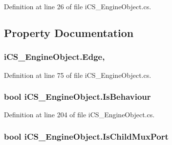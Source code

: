 Definition at line 26 of file i\+C\+S\+\_\+\+Engine\+Object.\+cs.



\subsection{Property Documentation}
\hypertarget{classi_c_s___engine_object_abd5c79ea55088275609565e1e79cc96a}{
\subsubsection[{Edge}]{ i\+C\+S\+\_\+\+Engine\+Object.\+Edge\hspace{0.3cm}{\ttfamily [get]}, {\ttfamily [set]}}}\label{classi_c_s___engine_object_abd5c79ea55088275609565e1e79cc96a}


Definition at line 75 of file i\+C\+S\+\_\+\+Engine\+Object.\+cs.

\hypertarget{classi_c_s___engine_object_aa81044c4d72b0846f8ba9918f47300ca}{
\subsubsection[{Is\+Behaviour}]{\setlength{\rightskip}{0pt plus 5cm}bool i\+C\+S\+\_\+\+Engine\+Object.\+Is\+Behaviour\hspace{0.3cm}{\ttfamily [get]}}}\label{classi_c_s___engine_object_aa81044c4d72b0846f8ba9918f47300ca}


Definition at line 204 of file i\+C\+S\+\_\+\+Engine\+Object.\+cs.

\hypertarget{classi_c_s___engine_object_a93eb2479c7beeed9db9b59b64de585e5}{
\subsubsection[{Is\+Child\+Mux\+Port}]{\setlength{\rightskip}{0pt plus 5cm}bool i\+C\+S\+\_\+\+Engine\+Object.\+Is\+Child\+Mux\+Port\hspace{0.3cm}{\ttfamily [get]}}}\label{classi_c_s___engine_object_a93eb2479c7beeed9db9b59b64de585e5}


